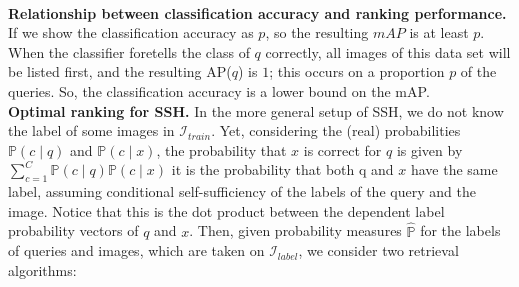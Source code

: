 \documentclass{article}
\begin{document}
\\

\textbf{Relationship between classification accuracy and ranking performance.} If we show the classification accuracy as $p$, so the resulting $mAP$ is at least $p$. When the classifier foretells the class of $q$ correctly, all images of this data set will be listed first, and the resulting AP($q$) is $1$; this occurs on a proportion $p$ of the queries. So, the classification accuracy is a lower bound on the mAP.
\\

\textbf{Optimal ranking for SSH.} In the more general setup of SSH, we do not know the label of some images in $\mathcal{I}_{train}$. Yet, considering the (real) probabilities $\mathbb{P}(c\mid q)$ and $\mathbb{P}(c\mid x)$, the probability that $x$ is correct for $q$ is given by $\sum_{c=1}^C \mathbb{P}(c\mid q) \mathbb{P}(c\mid x) $ it is the probability that both q and $x$ have the same label, assuming conditional self-sufficiency of the labels of the query and the image. Notice that this is the dot product between the dependent label probability vectors of $q$ and $x$. Then, given probability measures $\hat{\mathbb{P}}$  for the labels of queries and images, which are taken on $\mathcal{I}_{label}$, we consider two retrieval algorithms:
\end{document}
